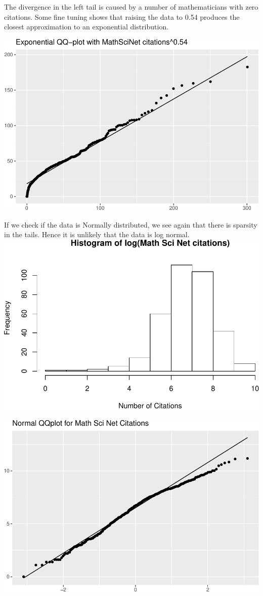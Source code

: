 \documentclass[]{article}
\begin{document}
The divergence in the left tail is caused by a number of mathematicians
with zero citations. Some fine tuning shows that raising the data to
0.54 produces the closest approximation to an exponential distribution.

\includegraphics{final_files/figure-latex/unnamed-chunk-15-1.pdf}

If we check if the data is Normally distributed, we see again that there
is sparsity in the tails. Hence it is unlikely that the data is log
normal.
\includegraphics{final_files/figure-latex/unnamed-chunk-16-1.pdf}

\includegraphics{final_files/figure-latex/unnamed-chunk-17-1.pdf}
\end{document}
